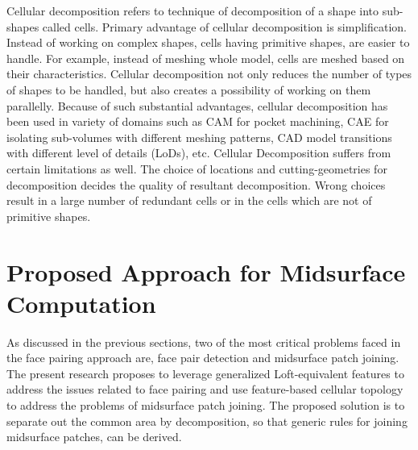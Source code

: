 Cellular decomposition refers to technique of decomposition of a shape into sub-shapes called cells. 
Primary advantage of cellular decomposition is simplification. Instead of working on complex shapes, cells having primitive shapes, are easier to handle. For example, instead of meshing whole model, cells are meshed based on their characteristics. Cellular decomposition not only reduces the number of types of shapes to be handled, but also creates a possibility of working on them parallelly. Because of such substantial advantages, cellular decomposition has been used in variety of domains such as CAM for pocket machining, CAE for isolating sub-volumes with different meshing patterns, CAD model transitions with different level of details (LoDs), etc. Cellular Decomposition suffers from certain limitations as well. The choice of locations and cutting-geometries for decomposition decides the quality of resultant decomposition. Wrong choices result in a large number of redundant cells or in the cells which are not of primitive shapes. 


\section{Proposed Approach for Midsurface Computation}  \label{sec:midsurfcelljoin:proposal}
As discussed in the previous sections, two of the most critical problems faced in the face pairing approach are, face pair detection and midsurface patch joining.  The present research proposes to leverage generalized Loft-equivalent features to address the issues related to face pairing and use feature-based cellular topology to address the problems of midsurface patch joining.  The proposed solution is to separate out the common area by decomposition, so that generic rules for joining midsurface patches, can be derived. 

